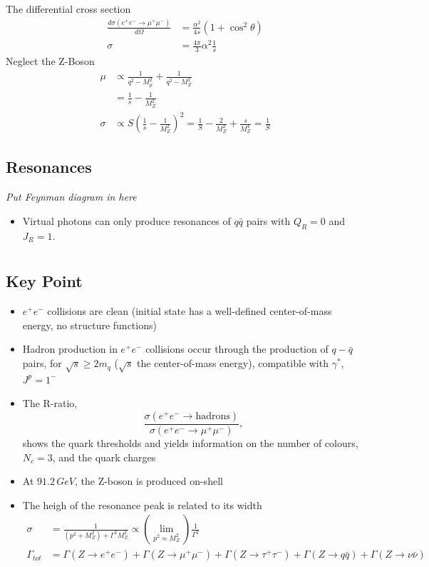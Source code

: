 \documentclass[a4paper, 11pt, normalem]{report}
\begin{document}
The differential cross section
\begin{align}
    \frac{d\sigma(e^+e^-\to\mu^+\mu^-)}{d\Omega} &= \frac{\alpha^2}{4s}(1+\cos^2\theta) \\
    \sigma &= \frac{4\pi}{3}\alpha^2\frac{1}{s}
\end{align}
Neglect the Z-Boson
\begin{align}
    \mu &\propto \frac{1}{q^2-M_\mu^2} + \frac{1}{q^2-M_Z^2} \\
        &= \frac{1}{s} - \frac{1}{M_Z^2} \\
    \sigma &\propto S\left(\frac{1}{s} - \frac{1}{M_Z^2}\right)^2 = \frac{1}{S} - \frac{2}{M_Z^2} + \frac{s}{M_Z^4} = \frac{1}{S}
\end{align}

\section{Resonances}
\textit{Put Feynman diagram in here}
\begin{itemize}
    \item Virtual photons can only produce resonances of $q\bar{q}$ pairs with $Q_R = 0$ and $J_R = 1$.
\end{itemize}

\chapter{}
\section{Key Point}
\begin{itemize}
    \item $e^+e^-$ collisions are clean (initial state has a well-defined center-of-mass energy, no structure functions)
    \item Hadron production in $e^+e^-$ collisions occur through the production of $q-\bar{q}$ pairs, for $\sqrt{s} \geq 2m_q$ ($\sqrt{s}$ the center-of-mass energy), compatible with $\gamma^*$, $J^p = 1^-$
    \item The R-ratio,
        \begin{equation}
            \frac{\sigma(e^+e^-\to\text{hadrons})}{\sigma(e^+e^-\to\mu^+\mu^-)},
        \end{equation}
        shows the quark thresholds and yields information on the number of colours, $N_c = 3$, and the quark charges
    \item At $91.2\,GeV$, the Z-boson is produced on-shell
    \item The heigh of the resonance peak is related to its width
        \begin{align}
            \sigma &= \frac{1}{(p^2+M_Z^2) + \Gamma^2M_Z^2} \propto \left(\lim_{p^2\approx M_Z^2}\right) \frac{1}{\Gamma^2} \\
            \Gamma_{tot} &= \Gamma(Z\to e^+e^-) + \Gamma(Z\to\mu^+\mu^-) + \Gamma(Z\to\tau^+\tau^-) + \Gamma(Z\to q\bar{q}) + \Gamma(Z\to\nu\bar{\nu})
        \end{align}
\end{itemize}
\end{document}
